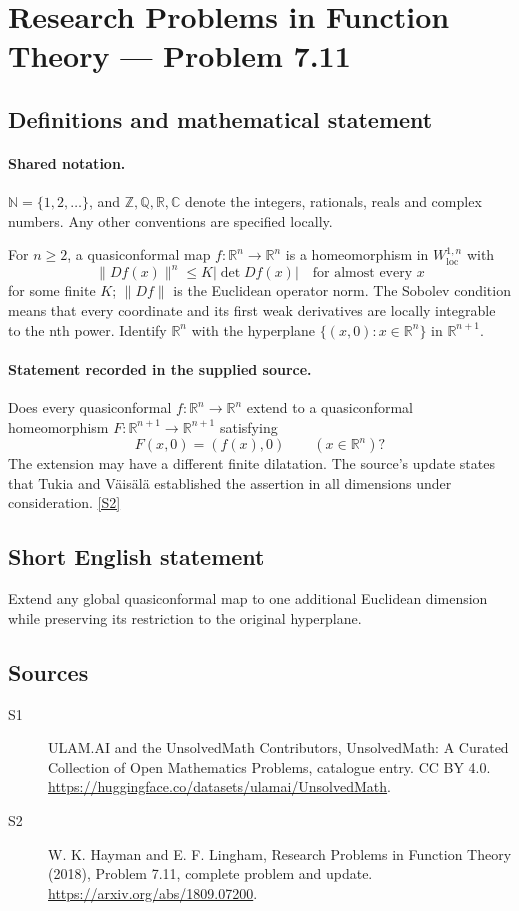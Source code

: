 \documentclass[11pt]{article}
\newcommand{\sref}[2]{\hyperlink{source:#1:#2}{[S#2]}}
\begin{document}
\section{Research Problems in Function Theory — Problem 7.11}\label{statement}

\subsection{Definitions and mathematical statement}

\paragraph{Shared notation.}$\mathbb N=\{1,2,\ldots\}$, and $\mathbb Z,\mathbb Q,\mathbb R,\mathbb C$ denote the integers, rationals, reals and complex numbers. Any other conventions are specified locally.


For $n\geq2$, a quasiconformal map $f:\mathbb R^n\to\mathbb R^n$ is a homeomorphism in $W^{1,n}_{\mathrm{loc}}$ with
\[\|Df(x)\|^n\leq K|\det Df(x)|\quad\text{for almost every }x\]
for some finite $K$; $\|Df\|$ is the Euclidean operator norm. The Sobolev condition means that every coordinate and its first weak derivatives are locally integrable to the nth power. Identify $\mathbb R^n$ with the hyperplane $\{(x,0):x\in\mathbb R^n\}$ in $\mathbb R^{n+1}$.
\paragraph{Statement recorded in the supplied source.}
Does every quasiconformal $f:\mathbb R^n\to\mathbb R^n$ extend to a quasiconformal homeomorphism $F:\mathbb R^{n+1}\to\mathbb R^{n+1}$ satisfying
\[F(x,0)=(f(x),0)\qquad(x\in\mathbb R^n)?\]
The extension may have a different finite dilatation. The source's update states that Tukia and V\"ais\"al\"a established the assertion in all dimensions under consideration. \sref{statement}{2}
\subsection{Short English statement}
Extend any global quasiconformal map to one additional Euclidean dimension while preserving its restriction to the original hyperplane.
\subsection{Sources}
\begin{description}
\item[\hypertarget{source:statement:1}{S1}] ULAM.AI and the UnsolvedMath Contributors, UnsolvedMath: A Curated Collection of Open Mathematics Problems, catalogue entry. CC BY 4.0. \url{https://huggingface.co/datasets/ulamai/UnsolvedMath}.
\item[\hypertarget{source:statement:2}{S2}] W. K. Hayman and E. F. Lingham, Research Problems in Function Theory (2018), Problem 7.11, complete problem and update. \url{https://arxiv.org/abs/1809.07200}.
\end{description}
\label{end:statement}
\end{document}
